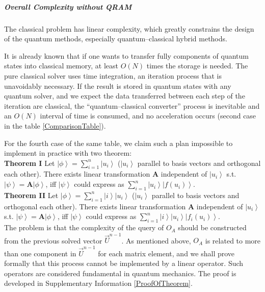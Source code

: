 \documentclass[%
 reprint,
 amsmath,amssymb,
pra,
]{revtex4-1}
\begin{document}
\subparagraph{Overall Complexity without QRAM} The classical problem has linear complexity, which greatly constrains the design of the quantum methods, especially quantum--classical hybrid methods. 

It is already known that if one wants to transfer fully components of quantum states into classical memory, at least $O(N)$ times the storage is needed. The pure classical solver uses time integration, an iteration process that is unavoidably necessary. If the result is stored in quantum states with any quantum solver, and we expect the data transferred between each step of the iteration are classical, the “quantum--classical converter” process is inevitable and an $O(N)$ interval of time is consumed, and no acceleration occurs (second case in the table \ref{ComparisonTable}).

For the fourth case of the same table, we claim such a plan impossible to implement in practice with two theorem:
~\\

\textbf{Theorem I} Let $\left|\phi\right\rangle = \sum_{i=1}^n \left|u_i\right\rangle$ ($\left|u_i\right\rangle$ parallel to basis vectors and orthogonal each other). There exists 
linear transformation $\bm{A}$ independent of $\left|u_{i}\right\rangle$ s.t. $\left|\psi\right\rangle = \bm{A}\left|\phi\right\rangle$, iff $\left|\psi\right\rangle$ could express as $\sum_{i=1}^{n}\left|u_i\right\rangle\left|f\left(u_i\right)\right\rangle$.
~\\

\textbf{Theorem II} Let $\left|\phi\right\rangle = \sum_{i=1}^n \left|i\right\rangle\left|u_i\right\rangle$ ($\left|u_i\right\rangle$ parallel to basis vectors and orthogonal each other). There exists 
linear transformation $\bm{A}$ independent of $\left|u_{i}\right\rangle$ s.t. $\left|\psi\right\rangle = \bm{A}\left|\phi\right\rangle$, iff $\left|\psi\right\rangle$ could express as $\sum_{i=1}^n \left|i\right\rangle\left|u_i\right\rangle\left|f_{i}\left(u_i\right)\right\rangle$.
~\\

The problem is that the complexity of the query of $O_A$ should be constructed from the previous solved vector $\vec{U}^{n-1}$. As mentioned above, $O_A$ is related to more than one component in $\vec{U}^{n-1}$ for each matrix element, and we shall prove formally that this process cannot be implemented by a linear operator. Such operators are considered fundamental in quantum mechanics. The proof is developed in Supplementary Information \ref{ProofOfTheorem}.
\end{document}
